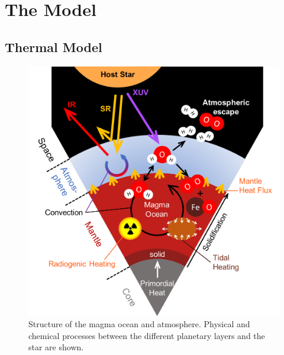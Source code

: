 \documentclass[paper=letterpaper,fontsize=12pt,oneside,twocolumn]{article}
\begin{document}
\section{The Model}
\label{Sec_Model}

\subsection{Thermal Model}
\label{sec_therm_model}
\begin{figure}
    \centering
    \includegraphics[width=\columnwidth]{BarthFig1.pdf}
    \caption{Structure of the magma ocean and atmosphere. Physical and chemical processes between the different planetary layers and the star are shown.}
    \label{struc_magma}
\end{figure}
\end{document}
